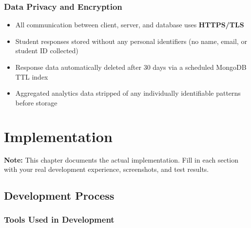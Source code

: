 ﻿\documentclass[12pt, a4paper]{article}
\begin{document}
\vspace{8pt}

\subsubsection*{Data Privacy and Encryption}

\begin{itemize}[leftmargin=1.5em, itemsep=3pt]
    \item All communication between client, server, and database uses \textbf{HTTPS/TLS}
    \item Student responses stored without any personal identifiers (no name, email, or student ID collected)
    \item Response data automatically deleted after 30 days via a scheduled MongoDB TTL index
    \item Aggregated analytics data stripped of any individually identifiable patterns before storage
\end{itemize}

\clearpage

\section{Implementation}

\begin{tcolorbox}[enhanced, colback=accentgold!10, colframe=accentgold, arc=3pt, boxrule=1pt, top=6pt, bottom=6pt]
\textbf{Note:} This chapter documents the actual implementation. Fill in each section with your real development experience, screenshots, and test results.
\end{tcolorbox}

\subsection{Development Process}



\subsubsection*{Tools Used in Development}
\end{document}
